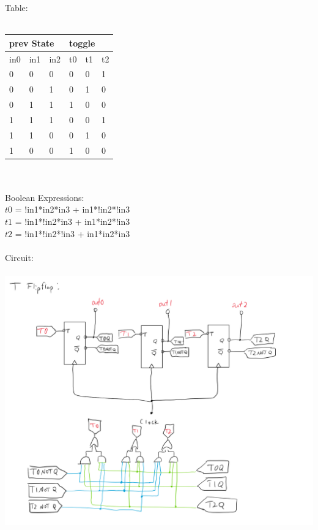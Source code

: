\documentclass[letterpaper]{article} %
\begin{document}
\begin{enumerate}
\begin{enumerate}
    Table: \\ \\
    \begin{tabular}{|lll|lll|}
      \hline
      \multicolumn{3}{|l|}{prev State} & \multicolumn{3}{|l|}{toggle} \\
      \hline
      in0      & in1      & in2      & t0      & t1      & t2     \\
      \hline
      0        & 0        & 0        & 0       & 0       & 1      \\
      0        & 0        & 1        & 0       & 1       & 0      \\
      0        & 1        & 1        & 1       & 0       & 0      \\
      1        & 1        & 1        & 0       & 0       & 1      \\
      1        & 1        & 0        & 0       & 1       & 0      \\
      1        & 0        & 0        & 1       & 0       & 0  \\
      \hline
    \end{tabular} \\ \\

    Boolean Expressions: \\
    $t0$ = !in1*in2*in3 + in1*!in2*!in3 \\
    $t1$ = !in1*!in2*in3 + in1*in2*!in3 \\
    $t2$ = !in1*!in2*!in3 + in1*in2*in3 \\ \\

    Circuit: \\ \\
    \includegraphics[scale=0.4]{tff}


\end{enumerate}
\end{enumerate}
\end{document}
